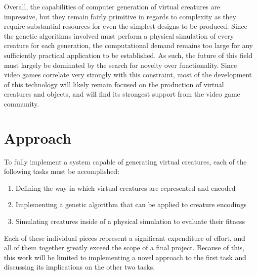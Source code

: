 \documentclass[12pt]{article}
\begin{document}
Overall, the capabilities of computer generation of virtual creatures are impressive, but they remain fairly primitive in regards to complexity as they require substantial resources for even the simplest designs to be produced.
Since the genetic algorithms involved must perform a physical simulation of every creature for each generation, the computational demand remains too large for any sufficiently practical application to be established.
As such, the future of this field must largely be dominated by the search for novelty over functionality.
Since video games correlate very strongly with this constraint, most of the development of this technology will likely remain focused on the production of virtual creatures and objects, and will find its strongest support from the video game community.

\section*{Approach}

To fully implement a system capable of generating virtual creatures, each of the following tasks must be accomplished:
\begin{enumerate}
  \item Defining the way in which virtual creatures are represented and encoded
  \item Implementing a genetic algorithm that can be applied to creature encodings
  \item Simulating creatures inside of a physical simulation to evaluate their fitness
\end{enumerate}
Each of these individual pieces represent a significant expenditure of effort, and all of them together greatly exceed the scope of a final project.
Because of this, this work will be limited to implementing a novel approach to the first task and discussing its implications on the other two tasks.
\end{document}
